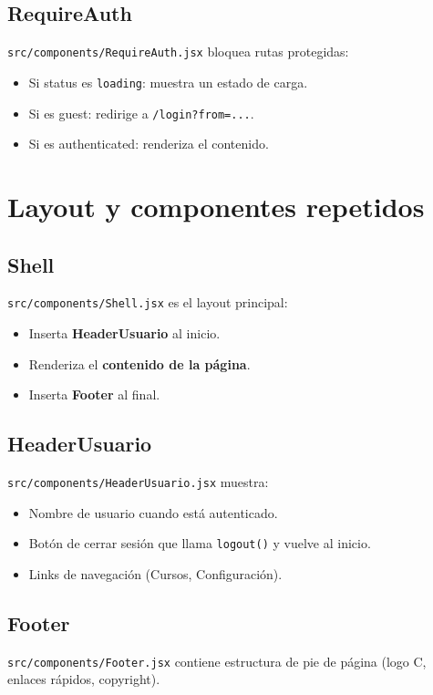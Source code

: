 \documentclass[12pt,a4paper]{article}
\begin{document}
\subsection{RequireAuth}
\texttt{src/components/RequireAuth.jsx} bloquea rutas protegidas:
\begin{itemize}[leftmargin=*]
  \item Si status es \texttt{loading}: muestra un estado de carga.
  \item Si es guest: redirige a \texttt{/login?from=...}.
  \item Si es authenticated: renderiza el contenido.
\end{itemize}

\section{Layout y componentes repetidos}
\subsection{Shell}
\texttt{src/components/Shell.jsx} es el layout principal:
\begin{itemize}[leftmargin=*]
  \item Inserta \textbf{HeaderUsuario} al inicio.
  \item Renderiza el \textbf{contenido de la p\'agina}.
  \item Inserta \textbf{Footer} al final.
\end{itemize}

\subsection{HeaderUsuario}
\texttt{src/components/HeaderUsuario.jsx} muestra:
\begin{itemize}[leftmargin=*]
  \item Nombre de usuario cuando est\'a autenticado.
  \item Bot\'on de cerrar sesi\'on que llama \texttt{logout()} y vuelve al inicio.
  \item Links de navegaci\'on (Cursos, Configuraci\'on).
\end{itemize}

\subsection{Footer}
\texttt{src/components/Footer.jsx} contiene estructura de pie de p\'agina (logo C, enlaces r\'apidos, copyright).
\end{document}
